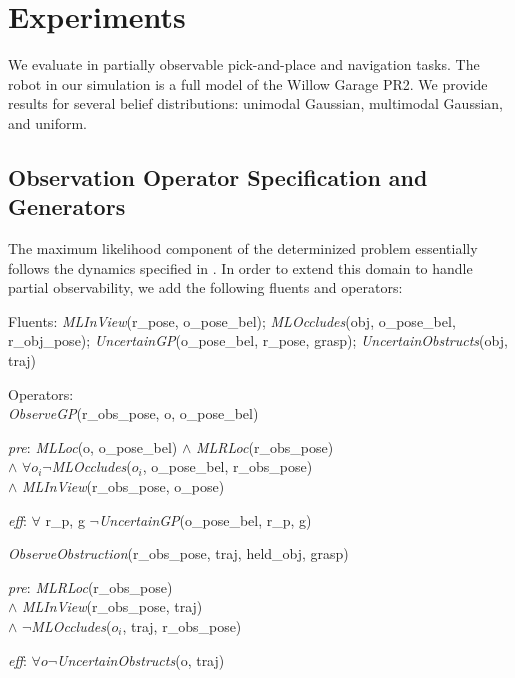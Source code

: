 \section{Experiments}
We evaluate \ibsp{} in partially observable pick-and-place and navigation tasks.
The robot in our simulation is a full model of the Willow Garage PR2. We
provide results for several belief distributions: unimodal Gaussian, multimodal
Gaussian, and uniform.
\subsection{Observation Operator Specification and Generators}
The maximum likelihood component of the determinized problem
essentially follows the dynamics specified in
. In order to extend this domain to handle
partial observability, we add the following fluents and operators:
\begin{tightlist}
  \item[Fluents:] \emph{MLInView}(r\_pose, o\_pose\_bel);
    \emph{MLOccludes}(obj, o\_pose\_bel, r\_obj\_pose);
    \emph{UncertainGP}(o\_pose\_bel, r\_pose, grasp);
    \emph{UncertainObstructs}(obj, traj)
  \item[]Operators: \\\emph{ObserveGP}(r\_obs\_pose, o, o\_pose\_bel)
\begin{tightlist}
  \item[\emph{pre}:] \emph{MLLoc}(o, o\_pose\_bel) $\wedge$
    \emph{MLRLoc}(r\_obs\_pose) \\$\wedge$ $\forall o_i
    \lnot$\emph{MLOccludes}($o_i$, o\_pose\_bel, r\_obs\_pose) \\ $\wedge$
    \emph{MLInView}(r\_obs\_pose, o\_pose)
  \item[\emph{eff}:] $\forall$ r\_p, g $\lnot$\emph{UncertainGP}(o\_pose\_bel, r\_p, g)
\end{tightlist}
\emph{ObserveObstruction}(r\_obs\_pose, traj, held\_obj, grasp) 

\begin{tightlist}
  \item[\emph{pre}:] \emph{MLRLoc}(r\_obs\_pose) \\$\wedge$
    \emph{MLInView}(r\_obs\_pose, traj)\\ $\wedge$
    $\lnot$\emph{MLOccludes}($o_i$, traj, r\_obs\_pose)
  \item[\emph{eff}:] $\forall o \lnot$\emph{UncertainObstructs}(o,
    traj)
\end{tightlist}
\end{tightlist}

